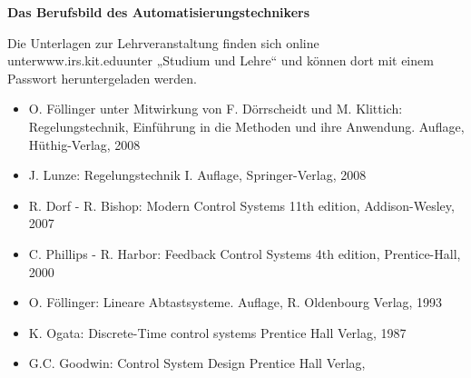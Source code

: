 \begin{course}
\begin{content}
 

\textbf{Das \textbf{Berufsbild des Automatisierungstechnikers}}


\end{content}

\begin{media}Die Unterlagen zur Lehrveranstaltung finden sich online unterwww.irs.kit.eduunter „Studium und Lehre“ und können dort mit einem Passwort heruntergeladen werden.

\end{media}

\begin{literature}\begin{itemize}\item O. Föllinger unter Mitwirkung von F. Dörrscheidt und M. Klittich:\newline
 Regelungstechnik, Einführung in die Methoden und ihre Anwendung. Auflage, Hüthig-Verlag, 2008  \item J. Lunze:\newline
 Regelungstechnik I. Auflage, Springer-Verlag, 2008  \item R. Dorf - R. Bishop:\newline
 Modern Control Systems \newline
 11th edition, Addison-Wesley, 2007  \item C. Phillips - R. Harbor: \newline
 Feedback Control Systems \newline
 4th edition, Prentice-Hall, 2000  \item O. Föllinger:\newline
 Lineare Abtastsysteme. Auflage, R. Oldenbourg Verlag, 1993  \item K. Ogata:\newline
 Discrete-Time control systems\newline
 Prentice Hall Verlag, 1987  \end{itemize}\begin{itemize}\item G.C. Goodwin:\newline
 Control System Design\newline
 Prentice Hall Verlag,  \end{itemize}\end{literature}



\end{course}